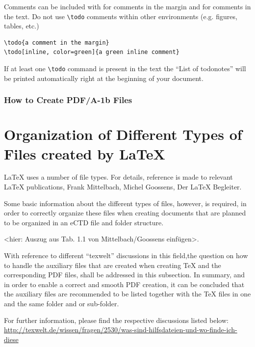 Comments can be included with  for comments in the
margin and  for comments in the text. Do not use \verb|\todo| comments within other environments (e.g. figures, tables, etc.)
\begin{verbatim}
\todo{a comment in the margin}
\todo[inline, color=green]{a green inline comment}
\end{verbatim}
If at least one \verb|\todo| command is present in the text the \enquote{List of todonotes} will be printed automatically right at the beginning of your document.

\subsubsection{How to Create PDF/A-1b Files}

\section{Organization of Different Types of Files created by \LaTeX{}}
\LaTeX{} uses a number of file types. For details, reference is made to relevant \LaTeX{} publications, \eg
Frank Mittelbach, Michel Goossens, Der LaTeX Begleiter.

Some basic information about the different types of files, however, is required, in order to correctly
organize these files when creating documents that are
planned to be organized in an eCTD file and folder structure.

<hier: Auszug aus Tab. 1.1 von Mittelbach/Goossens einfügen>.

With reference to different \enquote{texwelt} discussions in this field,the question on how to handle the auxiliary
files that are created when creating \TeX{} and the corresponding PDF files, shall be addressed in this subsection.
In summary, and in order to enable a correct and smooth PDF creation, it can be concluded that the auxiliary files are recommended to be listed together with the \TeX{} files in one and the same folder and or sub-folder.

For further information, please find the respective discussions listed below:\\ \url{http://texwelt.de/wissen/fragen/2530/was-sind-hilfsdateien-und-wo-finde-ich-diese}

